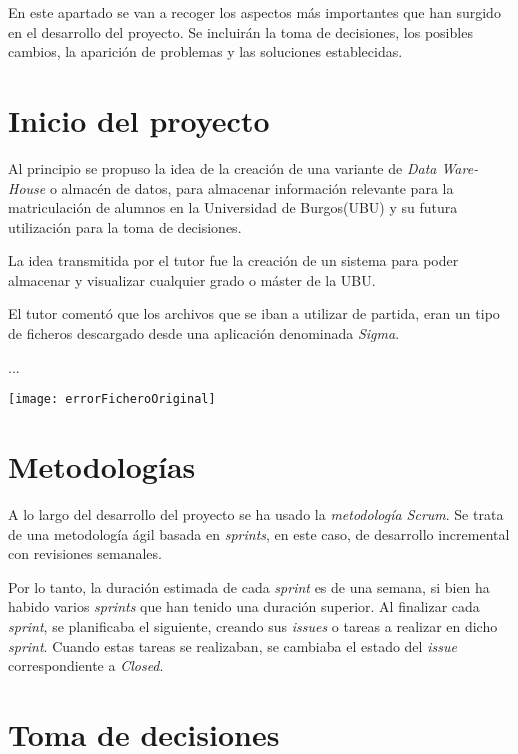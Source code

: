 
En este apartado se van a recoger los aspectos más importantes que han surgido en el desarrollo del proyecto. Se incluirán la toma de decisiones, los posibles cambios, la aparición de problemas y las soluciones establecidas.

\section{Inicio del proyecto}\label{inicio_del_proyecto}

Al principio se propuso la idea de la creación de una variante de \emph{Data Ware-House} o almacén de datos, para almacenar información relevante para la matriculación de alumnos en la Universidad de Burgos(UBU) y su futura utilización para la toma de decisiones.

La idea transmitida por el tutor fue la creación de un sistema para poder almacenar y visualizar cualquier grado o máster de la UBU.

El tutor comentó que los archivos que se iban a utilizar de partida, eran un tipo de ficheros descargado desde una aplicación denominada \emph{Sigma}.


...




\texttt{[image: errorFicheroOriginal]}


\section{Metodologías}\label{metodologias}

A lo largo del desarrollo del proyecto se ha usado la \emph{metodología Scrum}. Se trata de una metodología ágil basada en \emph{sprints}, en este caso, de desarrollo incremental con revisiones semanales.

Por lo tanto, la duración estimada de cada \emph{sprint} es de una semana, si bien ha habido varios \emph{sprints} que han tenido una duración superior. Al finalizar cada \emph{sprint}, se planificaba el siguiente, creando sus \emph{issues} o tareas a realizar en dicho \emph{sprint}. Cuando estas tareas se realizaban, se cambiaba el estado del \emph{issue} correspondiente a \emph{Closed}.  


\section{Toma de decisiones}\label{toma_de_decisiones}


